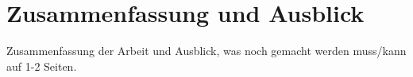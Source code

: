 \section{Zusammenfassung und Ausblick}
\label{Sec:Zusammenfassung_und_Ausblick}

Zusammenfassung der Arbeit und Ausblick, was noch gemacht werden muss/kann auf 1-2 Seiten.